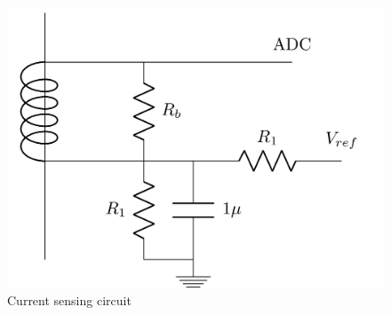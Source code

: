 \begin{figure} 
	\centering
	\includegraphics[width=0.5\linewidth]{tikz/currentCircuit}
	\caption[Current sensing circuit]{Current sensing circuit}
	\label{fig:currentCircuit}
	\vspace*{-3ex}
\end{figure}
